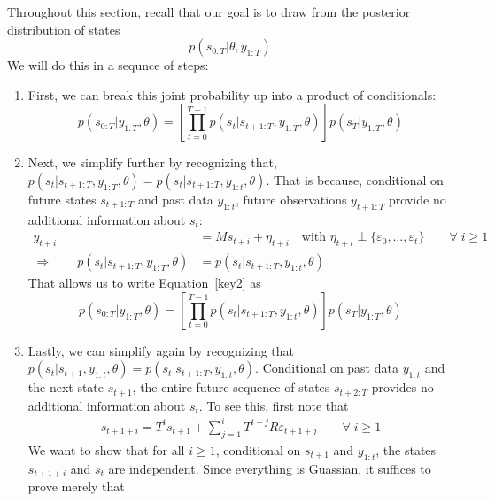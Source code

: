 \documentclass[a4paper,12pt]{article}
\begin{document}
Throughout this section, recall that our goal is to draw from the
posterior distribution of states
\begin{equation}
  p(s_{0:T}|\theta, y_{1:T})
\end{equation}
We will do this in a sequnce of steps:
\begin{enumerate}
  \item First, we can break this joint probability up into a product of
    conditionals:
    \begin{equation}
      \label{key2}
      p(s_{0:T}|y_{1:T},\theta) = 
      \left[ \prod_{t=0}^{T-1} p(s_t|s_{t+1:T},y_{1:T},\theta) \right] 
      p(s_T|y_{1:T},\theta)
    \end{equation}
  \item Next, we simplify further by recognizing that, 
    $p(s_t|s_{t+1:T},y_{1:T},\theta) = p(s_t|s_{t+1:T},y_{1:t},\theta)$.
    That is because, conditional on future states $s_{t+1:T}$ and past
    data $y_{1:t}$, future observations $y_{t+1:T}$ provide no
    additional information about $s_t$:
    \begin{align*}
      y_{t+i} &= M s_{t+i} + \eta_{t+i} 
      \quad \text{with } \eta_{t+i} \perp \{\varepsilon_0, \ldots,
      \varepsilon_t\} \qquad \forall \; i \geq 1 \\
      \Rightarrow\qquad 
      p(s_t|s_{t+1:T},y_{1:T},\theta)
      &= p(s_t|s_{t+1:T},y_{1:t},\theta)
    \end{align*}
    That allows us to write Equation~\ref{key2} as 
    \begin{equation}
      p(s_{0:T}|y_{1:T},\theta) = 
      \left[ \prod_{t=0}^{T-1} p(s_t|s_{t+1:T},y_{1:t},\theta) \right] 
      p(s_T|y_{1:T},\theta)
    \end{equation}
  \item Lastly, we can simplify again by recognizing that
    $p(s_t|s_{t+1}, y_{1:t},\theta) = p(s_t|s_{t+1:T},y_{1:t},\theta)$.
    Conditional on past data $y_{1:t}$ and the next state $s_{t+1}$, the
    entire future sequence of states $s_{t+2:T}$ provides no additional
    information about $s_t$.  To see this, first note that
    \begin{align}
      s_{t+1+i} = T^i s_{t+1} + \sum^i_{j=1} T^{i-j} R \varepsilon_{t+1+j}
      \qquad \forall \; i \geq 1 
      \label{st1i}
    \end{align}
    We want to show that for all $i\geq1$, conditional on $s_{t+1}$ and
    $y_{1:t}$, the states $s_{t+1+i}$ and $s_t$ are independent.  Since
    everything is Guassian, it suffices to prove merely that

\end{enumerate}
\end{document}
